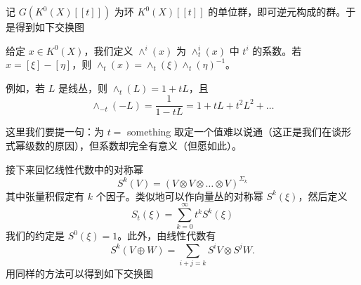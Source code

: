 记 $G(K^0(X)[[t]])$ 为环 $K^0(X)[[t]]$ 的单位群，即可逆元构成的群。于是得到如下交换图
\begin{center}
\end{center}

给定 $x\in K^0(X)$，我们定义 $\wedge^i(x)$ 为 $\wedge^i_t(x)$ 中 $t^i$ 的系数。若 $x = [\xi]-[\eta]$，则 $\wedge_t(x) = \wedge_t(\xi)\wedge_t(\eta)^{-1}$。

例如，若 $L$ 是线丛，则 $\wedge_t(L) = 1+tL$，且
\[ \wedge_{-t}(-L) = \frac{1}{1-tL} = 1+tL+t^2L^2+\ldots \]

这里我们要提一句：为 $t=$ something 取定一个值难以说通（这正是我们在谈形式幂级数的原因），但系数却完全有意义（但愿如此）。

接下来回忆线性代数中的对称幂
\[ S^k(V) = (V\otimes V\otimes\ldots\otimes V)^{\Sigma_k} \]
其中张量积假定有 $k$ 个因子。类似地可以作向量丛的对称幂 $S^k(\xi)$，然后定义
\[ S_t(\xi) = \sum_{k=0}^\infty t^k S^k(\xi) \]
我们的约定是 $S^0(\xi) = 1$。此外，由线性代数有
\[ S^k(V\oplus W) = \sum_{i+j=k}S^iV\otimes S^jW. \]
用同样的方法可以得到如下交换图
\begin{center}
\end{center}

